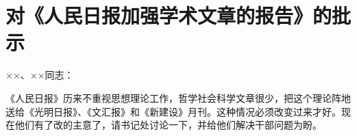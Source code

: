 \section[对《人民日报加强学术文章的报告》的批示（一九六四年二月三日）]{对《人民日报加强学术文章的报告》的批示}


\noindent ××、××同志：

《人民日报》历来不重视思想理论工作，哲学社会科学文章很少，把这个理论阵地送给《光明日报》、《文汇报》和《新建设》月刊。这种情况必须改变过来才好。现在他们有了改的主意了，请书记处讨论一下，并给他们解决干部问题为盼。

